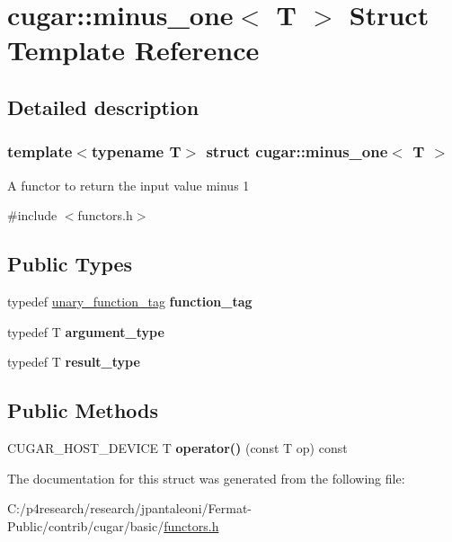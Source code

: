 \hypertarget{structcugar_1_1minus__one}{}\section{cugar\+:\+:minus\+\_\+one$<$ T $>$ Struct Template Reference}
\label{structcugar_1_1minus__one}


\subsection{Detailed description}
\subsubsection*{template$<$typename T$>$\newline
struct cugar\+::minus\+\_\+one$<$ T $>$}

A functor to return the input value minus 1 

{\ttfamily \#include $<$functors.\+h$>$}

\subsection*{Public Types}
\begin{DoxyCompactItemize}
\item 
\mbox{\label{structcugar_1_1minus__one_a4392ae633a95d33555f54b49af2614f1}} 
typedef \hyperlink{structcugar_1_1unary__function__tag}{unary\+\_\+function\+\_\+tag} {\bfseries function\+\_\+tag}
\item 
\mbox{\label{structcugar_1_1minus__one_a7b64f4b4757a757ed8721b9f05ebe071}} 
typedef T {\bfseries argument\+\_\+type}
\item 
\mbox{\label{structcugar_1_1minus__one_aa87392f50cf8cb87173332f4c980f799}} 
typedef T {\bfseries result\+\_\+type}
\end{DoxyCompactItemize}
\subsection*{Public Methods}
\begin{DoxyCompactItemize}
\item 
\mbox{\label{structcugar_1_1minus__one_a8226c566e37ab39af568f826d4a0daea}} 
C\+U\+G\+A\+R\+\_\+\+H\+O\+S\+T\+\_\+\+D\+E\+V\+I\+CE T {\bfseries operator()} (const T op) const
\end{DoxyCompactItemize}


The documentation for this struct was generated from the following file\+:\begin{DoxyCompactItemize}
\item 
C\+:/p4research/research/jpantaleoni/\+Fermat-\/\+Public/contrib/cugar/basic/\hyperlink{functors_8h}{functors.\+h}\end{DoxyCompactItemize}
